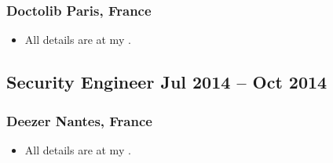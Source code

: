 \subsubsection{Doctolib  \texorpdfstring{\hspace*{\fill}}{\hspace*{\fill}} \normalfont Paris, France}

\begin{itemize}
    \item All details are at my .
\end{itemize}	

\subsection{Security Engineer \texorpdfstring{\hspace*{\fill}}{\hspace*{\fill}} \normalfont Jul 2014 -- Oct 2014}
\subsubsection{Deezer  \texorpdfstring{\hspace*{\fill}}{\hspace*{\fill}} \normalfont Nantes, France}

\begin{itemize}
    \item All details are at my .
\end{itemize}
